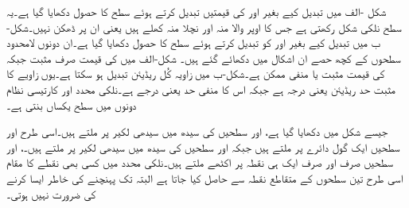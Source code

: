 شکل -الف میں  تبدیل کیے بغیر  اور  کی قیمتیں تبدیل کرتے ہوئے  سطح کا حصول دکھایا گیا ہے۔یہ سطح نلکی شکل رکھتی ہے  جس کا اوپر والا منہ اور نچلا منہ کھلے ہیں یعنی ان پر ڈھکن نہیں۔شکل-ب میں  تبدیل کیے بغیر  اور  کو تبدیل کرتے ہوئے  سطح کا حصول دکھایا گیا ہے۔ان دونوں لامحدود سطحوں کے کچھ حصے ان  اشکال میں  دکھائے گئے ہیں۔ شکل-الف میں  کی قیمت صرف مثبت جبکہ  کی قیمت مثبت یا منفی ممکن ہے۔شکل-ب میں زاویہ کُل  ریڈیئن تبدیل ہو سکتا ہے۔یوں زاویے کا مثبت حد  ریڈیئن یعنی  درجہ ہے جبکہ اس کا منفی حد  یعنی  درجے ہے۔نلکی محدد اور کارتیسی نظام دونوں میں   سطح یکساں بنتی ہے۔

جیسے شکل  میں دکھایا گیا ہے،  اور   سطحیں  کی سیدھ میں سیدھی لکیر پر ملتے ہیں۔اسی طرح  اور  سطحیں ایک گول دائرے پر ملتے ہیں جبکہ  اور  سطحیں  کی سیدھ میں سیدھی لکیر پر ملتے ہیں۔،  اور  سطحیں صرف اور صرف ایک ہی نقطہ  پر اکٹھے ملتے ہیں۔نلکی محدد میں کسی بھی نقطے  کا مقام اسی طرح تین سطحوں کے  متقاطع نقطہ سے حاصل کیا جاتا ہے البتہ  تک پہنچنے کی خاطر ایسا کرنے کی ضرورت نہیں ہوتی۔

